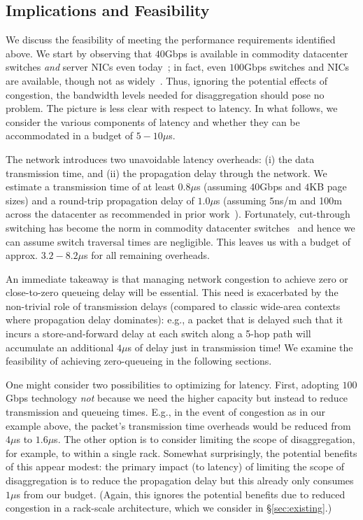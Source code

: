 \subsection{Implications and Feasibility}
\label{ssec:rtt}

We discuss the feasibility of meeting the performance requirements identified above. We start by observing that $40$Gbps is available in commodity datacenter switches \emph{and} server NICs even today~\cite{need-cites}; in fact, even $100$Gbps switches and NICs are available, though not as widely~\cite{need-cites}.
Thus, ignoring the potential effects of congestion, the bandwidth levels needed for disaggregation should pose no problem.
The picture is less clear with respect to latency. In what follows, we consider the various components of latency and whether they can be accommodated in a budget of $5-10\mu$s. 

The network introduces two unavoidable latency overheads: (i) the data transmission time, and (ii) the propagation delay through the network. We estimate a  transmission time of at least $0.8\mu$s (assuming $40$Gbps and $4$KB page sizes) 
and a round-trip propagation delay of $1.0\mu$s (assuming $5$ns/m and 100m across the datacenter as recommended in prior work~\cite{rosenblum-hotos}).
Fortunately, cut-through switching has become the norm in commodity datacenter switches~\cite{arista,broadcom} and hence we can assume switch traversal times are negligible. 
This leaves us with a budget of approx. $3.2-8.2\mu$s for all remaining overheads.

An immediate takeaway is that managing network congestion to achieve zero or close-to-zero queueing delay will be essential. This need is exacerbated by the 
non-trivial role of transmission delays (compared to classic wide-area contexts where propagation delay dominates): e.g., a packet that is delayed such that it incurs a store-and-forward delay at each switch along a 5-hop path will accumulate an additional $4\mu$s of delay just in transmission time! We examine the feasibility of achieving zero-queueing in the following sections. 

One might consider two possibilities to optimizing for latency. First, adopting $100$Gbps technology \emph{not} because we need the higher capacity but instead to reduce transmission and queueing times. E.g., in the event of congestion as in our example above, the packet's transmission time overheads would be reduced from $4\mu$s to $1.6\mu$s. 
The other option is to consider limiting the scope of disaggregation, for example, to within a single rack. Somewhat surprisingly, the potential benefits of this appear modest: the primary impact (to latency) of limiting the scope of disaggregation is to reduce the propagation delay but this already only consumes $1\mu$s from our budget.
(Again, this ignores the potential benefits due to reduced congestion in a rack-scale architecture, which we consider in \S\ref{sec:existing}.)

